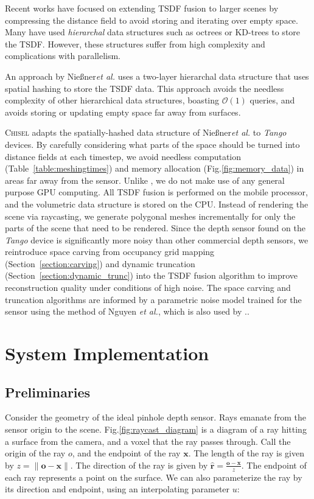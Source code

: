 \documentclass[conference]{IEEEtran}
\newcommand{\sref}[1]{Section~\ref{#1}}
\newcommand{\figref}[1]{Fig.\ref{#1}}
\newcommand{\tabref}[1]{Table~\ref{#1}}
\newcommand{\etal}{\textit{et al.}\xspace}
\newcommand{\Tango}{\textit{Tango}\xspace}
\newcommand{\TSDF}{TSDF\xspace}
\newcommand{\Niessner}{Nie{\ss}ner\xspace}
\newcommand{\chisel}{\textsc{Chisel}\xspace}
\begin{document}
Recent works have focused on extending \TSDF fusion to larger scenes by
compressing the distance field to avoid storing and iterating
over empty space. Many have used \textit{hierarchal} data structures such as
octrees or KD-trees to store the \TSDF \cite{Zeng2012, Chen2012}. However, these
structures suffer from high complexity and complications with parallelism. 

An approach by \Niessner \etal \cite{NiessnerHashing} uses a two-layer
hierarchal data structure that uses spatial hashing \cite{SpatialHashing} to
store the \TSDF data. This approach avoids the needless complexity of other
hierarchical data structures, boasting $\mathcal{O}(1)$ queries, and avoids
storing or updating empty space far away from surfaces.

\chisel adapts the spatially-hashed data structure of
\Niessner \etal \cite{NiessnerHashing} to \Tango devices. By carefully
considering what parts of the space should be turned into distance fields at
each timestep, we avoid needless computation (\tabref{table:meshingtimes}) and
memory allocation (\figref{fig:memory_data}) in areas far away from the sensor.
Unlike \cite{NiessnerHashing}, we do not make use of any general purpose GPU
computing. All \TSDF fusion is performed on the mobile processor, and the
volumetric data structure is stored on the CPU. Instead of rendering the scene
via raycasting, we generate polygonal meshes incrementally for only the parts
of the scene that need to be rendered. Since the depth sensor found on the
\Tango device is significantly more noisy than other commercial depth
sensors, we reintroduce space carving \cite{Elfes1989} from occupancy grid
mapping (\sref{section:carving}) and dynamic truncation
(\sref{section:dynamic_trunc}) into the \TSDF fusion algorithm to improve
reconstruction quality under conditions of high noise. The space carving and
truncation algorithms are informed by a parametric noise model trained for the
sensor using the method of Nguyen \etal \cite{Nguyen2012}, which is also used
by \cite{NiessnerHashing}..

\section{System Implementation} 
\label{section:mapping}
\subsection{Preliminaries}
\label{section:prelim}
Consider the geometry of the ideal pinhole depth sensor. Rays emanate from the
sensor origin to the scene.  \figref{fig:raycast_diagram} is a diagram of a ray hitting a
 surface from the camera, and a voxel that the ray passes through.  Call  the
 origin of the ray $o$, and the endpoint of the ray $\mathbf{x}$.
The length of the ray is given by $z = \|\mathbf{o}
- \mathbf{x}\|$. The direction of the ray is given by $\mathbf{\hat{r}} =
\frac{\mathbf{o} - \mathbf{x}}{z}$. The endpoint of each ray represents a point
on the surface.  We can also parameterize the ray by its direction and
endpoint, using an interpolating parameter $u$:
\end{document}
